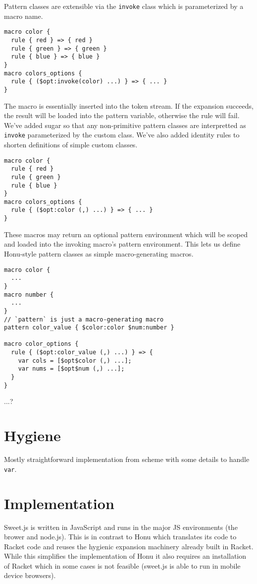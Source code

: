 \documentclass[preprint,10pt]{sigplanconf}
\begin{document}
Pattern classes are extensible via the \verb!invoke! class which is
parameterized by a macro name.

\begin{verbatim}
macro color {
  rule { red } => { red }
  rule { green } => { green }
  rule { blue } => { blue }
}
macro colors_options {
  rule { ($opt:invoke(color) ...) } => { ... }
}
\end{verbatim}

The macro is essentially inserted into the token stream. If the
expansion succeeds, the result will be loaded into the pattern
variable, otherwise the rule will fail. We've added sugar so that any
non-primitive pattern classes are interpretted as \verb!invoke!
parameterized by the custom class. We've also added identity rules to
shorten definitions of simple custom classes.

\begin{verbatim}
macro color {
  rule { red }
  rule { green }
  rule { blue }
}
macro colors_options {
  rule { ($opt:color (,) ...) } => { ... }
}
\end{verbatim}

These macros may return an optional pattern environment which will be
scoped and loaded into the invoking macro's pattern environment. This
lets us define Honu-style pattern classes as simple macro-generating
macros.

\begin{verbatim}
macro color {
  ...
}
macro number {
  ...
}
// `pattern` is just a macro-generating macro
pattern color_value { $color:color $num:number }

macro color_options {
  rule { ($opt:color_value (,) ...) } => {
    var cols = [$opt$color (,) ...];
    var nums = [$opt$num (,) ...];
  }
}

\end{verbatim}

...?

\section{Hygiene}
\label{sec-5}

Mostly straightforward implementation from scheme with some details to
handle \texttt{var}.
\section{Implementation}
\label{sec-6}
Sweet.js is written in JavaScript and runs in the major JS
environments (\ie the brower and node.js). This is in contrast to Honu
which translates its code to Racket code and reuses the hygienic
expansion machinery already built in Racket. While this simplifies
the implementation of Honu it also requires an installation of Racket
which in some cases is not feasible (\eg sweet.js is able to run in
mobile device browsers).
\end{document}
